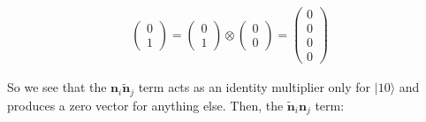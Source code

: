 \documentclass{article}
\begin{document}
\begin{align*}
     \begin{pmatrix}0\\1\end{pmatrix}
     = \begin{pmatrix}0\\1\end{pmatrix}
     \otimes
     \begin{pmatrix}0\\0\end{pmatrix}
     = \begin{pmatrix}0\\0\\0\\0\end{pmatrix}
\end{align*}

So we see that the $\bm{n}_i\bm{\widetilde{n}}_j$ term acts as an identity multiplier only for $|10\rangle$ and produces a zero vector for anything else. Then, the $\bm{\widetilde{n}}_i\bm{n}_j$ term:
\end{document}
